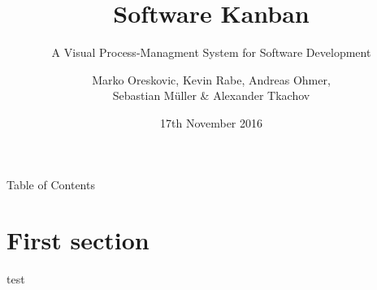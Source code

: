 \documentclass[14pt,t]{beamer}
\title{Software Kanban}
\subtitle{A Visual Process-Managment System for Software Development}
\author{{\footnotesize Marko Oreskovic, Kevin Rabe, Andreas Ohmer,\\ Sebastian Müller \& Alexander Tkachov}}
\institute{Frankfurt Univerity of Applied Sciences}
\date{\small 17th November 2016}
\begin{document}
	\maketitle
	
	\begin{frame}{Table of Contents}
		\tableofcontents[hideallsubsections]
	\end{frame}
	
	\section{First section}
		\begin{frame}{\secname}
			test
		\end{frame}
	
\end{document}

